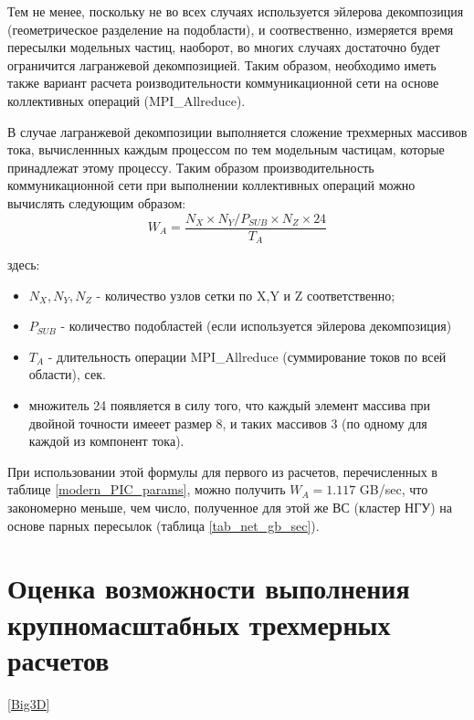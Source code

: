 \clearpage

Тем не менее, поскольку не во всех случаях используется эйлерова декомпозиция (геометрическое разделение на подобласти), и соотвественно, измеряется время пересылки модельных частиц, наоборот, во многих случаях достаточно будет ограничится лагранжевой декомпозицией. Таким образом, необходимо иметь также вариант расчета роизводительности коммуникационной сети на основе коллективных операций (MPI\_Allreduce).

В случае лагранжевой декомпозиции выполняется сложение трехмерных массивов тока, вычисленнных каждым процессом по тем модельным частицам, которые принадлежат этому процессу. Таким образом производительность коммуникационной сети при выполнении коллективных операций можно вычислять следующим образом:
\begin{equation}
W_A = \frac{N_X\times N_Y/P_{SUB} \times N_Z \times 24}{T_A}
\label{Net_performance_collective}
\end{equation}

здесь:
\begin{itemize}
	\item $N_X, N_Y, N_Z$ - количество узлов сетки по X,Y и Z соответственно;
	\item $P_{SUB}$ - количество подобластей (если используется эйлерова декомпозиция)
	\item $T_{A}$ - длительность операции MPI\_Allreduce (суммирование токов по всей области), сек.
	\item множитель 24 появляется в силу того, что каждый элемент массива при двойной точности имееет размер 8, и таких массивов 3 (по одному для каждой из компонент тока).
\end{itemize}	

При использовании этой формулы для первого из расчетов, перечисленных в таблице \ref{modern_PIC_params}, можно получить 
$W_A = 1.117$ GB/sec, что закономерно меньше, чем число, полученное для этой же ВС (кластер НГУ) на основе парных пересылок
(таблица \ref{tab_net_gb_sec}).





%		
%		

\section{Оценка возможности выполнения крупномасштабных трехмерных расчетов}
\ref{Big3D}


